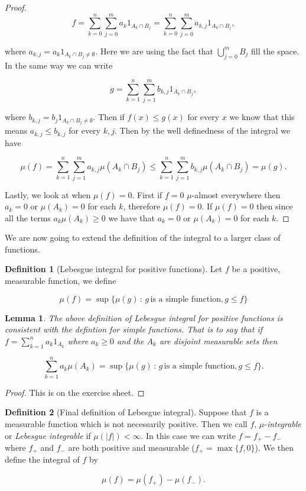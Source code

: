 \documentclass[
]{book}
\newtheorem{lemma}{Lemma}[chapter]
\theoremstyle{definition}
\newtheorem{definition}{Definition}[chapter]
\theoremstyle{definition}
\theoremstyle{definition}
\theoremstyle{definition}
\theoremstyle{remark}
\begin{document}
\begin{proof}
\[ f = \sum_{k=0}^n \sum_{j=0}^m a_k 1_{A_k \cap B_j} = \sum_{k=0}^n \sum_{j=0}^m a_{k,j}1_{A_k \cap B_j},\]

where \(a_{k,j} = a_k 1_{A_k \cap B_j \neq \emptyset}\). Here we are using the fact that \(\bigcup_{j=0}^m B_j\) fill the space. In the same way we can write

\[ g = \sum_{k=1}^n \sum_{j=1}^m b_{k,j}1_{A_k \cap B_j}, \]

where \(b_{k,j} = b_j 1_{A_k \cap B_j \neq \emptyset}\). Then if \(f(x) \leq g(x)\) for every \(x\) we know that this means \(a_{k,j} \leq b_{k,j}\) for every \(k,j\). Then by the well definedness of the integral we have

\[ \mu(f) = \sum_{k=1}^n \sum_{j=1}^m a_{k,j} \mu(A_k \cap B_j) \leq \sum_{k=1}^n \sum_{j=1}^m b_{k,j} \mu(A_k \cap B_j) = \mu(g).\]

Lastly, we look at when \(\mu(f)=0\). First if \(f=0\) \(\mu\)-almost everywhere then \(a_k=0\) or \(\mu(A_k)=0\) for each \(k\), therefore \(\mu(f)=0\). If \(\mu(f) =0\) then since all the terms \(a_k \mu(A_k) \geq 0\) we have that \(a_k=0\) or \(\mu(A_k) =0\) for each \(k\).
\end{proof}

We are now going to extend the definition of the integral to a larger class of functions.

\begin{definition}[Lebesgue integral for positive functions]
Let \(f\) be a positive, measurable function, we define

\[ \mu(f) = \sup \{ \mu(g)\, :\, g \, \mbox{is a simple function}, g \leq f\} \]
\end{definition}

\begin{lemma}
The above definition of Lebesgue integral for positive functions is consistent with the defintion for simple functions. That is to say that if \(f = \sum_{k=1}^n a_k 1_{A_k}\) where \(a_k \geq 0\) and the \(A_k\) are disjoint measurable sets then

\[ \sum_{k=1}^n a_k \mu(A_k) = \sup \{ \mu(g)\, :\, g \, \mbox{is a simple function}, g \leq f\}.  \]
\end{lemma}

\begin{proof}
This is on the exercise sheet.
\end{proof}

\begin{definition}[Final definition of Lebesgue integral]
Suppose that \(f\) is a measurable function which is not necessarily positive. Then we call \(f\), \(\mu\)-\emph{integrable} or \emph{Lebesgue integrable} if \(\mu(|f|)< \infty\). In this case we can write \(f = f_+ - f_{-}\) where \(f_+\) and \(f_-\) are both positive and measurable (\(f_+ = \max\{f, 0\}\)). We then define the integral of \(f\) by

\[ \mu(f) = \mu(f_+) - \mu(f_-). \]
\end{definition}
\end{document}
